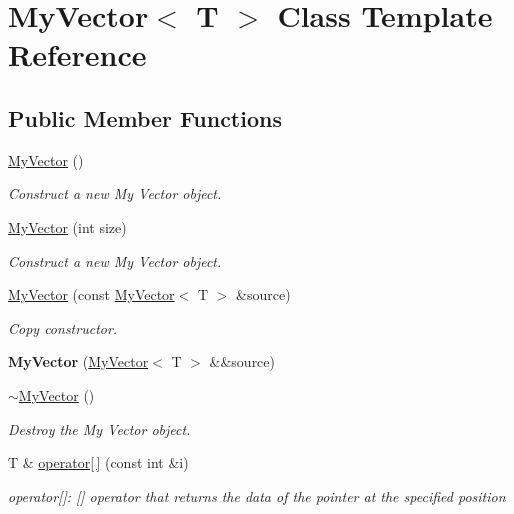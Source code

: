 \hypertarget{class_my_vector}{}\section{My\+Vector$<$ T $>$ Class Template Reference}
\label{class_my_vector}
\subsection*{Public Member Functions}
\begin{DoxyCompactItemize}
\item 
\mbox{\hyperlink{class_my_vector_ac356762c5ced52c0d934476cef32e472}{My\+Vector}} ()
\begin{DoxyCompactList}\small\item\em Construct a new My Vector object. \end{DoxyCompactList}\item 
\mbox{\hyperlink{class_my_vector_a9f780e2c6c6f35610a656b64395c6d1b}{My\+Vector}} (int size)
\begin{DoxyCompactList}\small\item\em Construct a new My Vector object. \end{DoxyCompactList}\item 
\mbox{\hyperlink{class_my_vector_aaf93995f4a267cc279867c10cfbef623}{My\+Vector}} (const \mbox{\hyperlink{class_my_vector}{My\+Vector}}$<$ T $>$ \&source)
\begin{DoxyCompactList}\small\item\em Copy constructor. \end{DoxyCompactList}\item 
\mbox{\label{class_my_vector_a7b2d4483f19b1ea3525e49336c857111}} 
{\bfseries My\+Vector} (\mbox{\hyperlink{class_my_vector}{My\+Vector}}$<$ T $>$ \&\&source)
\item 
\mbox{\hyperlink{class_my_vector_abe59f181259ff63fa583f4bd87a9737e}{$\sim$\+My\+Vector}} ()
\begin{DoxyCompactList}\small\item\em Destroy the My Vector object. \end{DoxyCompactList}\item 
T \& \mbox{\hyperlink{class_my_vector_a52eca35ed558d978bf5a8541f9d0115c}{operator\mbox{[}$\,$\mbox{]}}} (const int \&i)
\begin{DoxyCompactList}\small\item\em operator\mbox{[}\mbox{]}\+: \mbox{[}\mbox{]} operator that returns the data of the pointer at the specified position \end{DoxyCompactList}\item 

\end{DoxyCompactItemize}
